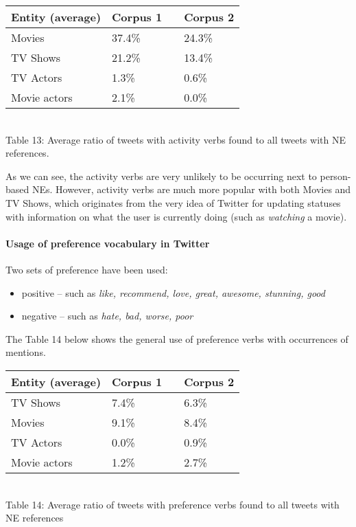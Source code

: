 \begin{center}
  \begin{tabular}{ | p{4cm} | p{2cm} | p{1cm}| p{2cm} | } \hline
    Entity (average) & Corpus 1 & & Corpus 2 \\ \hline
    Movies & 37.4\% & & 24.3\% \\ \hline
    TV Shows & 21.2\% & & 13.4\% \\ \hline
    TV Actors & 1.3\% & & 0.6\% \\ \hline
    Movie actors & 2.1\% & & 0.0\% \\ \hline
  \end{tabular} \\
  Table 13: Average ratio of tweets with activity verbs found to all tweets with NE references. \\
\end{center}

As we can see, the activity verbs are very unlikely to be occurring next to
person-based NEs. However, activity verbs are much more popular with both
Movies and TV Shows, which originates from the very idea of Twitter for
updating statuses with information on what the user is currently doing (such as \textit{watching}
a movie).

\paragraph{Usage of preference vocabulary in Twitter}
Two sets of preference have been used:
\begin{itemize}
  \item positive -- such as \textit{like, recommend, love, great, awesome, stunning, good}
  \item negative -- such as \textit{hate, bad, worse, poor}
\end{itemize}

The Table 14 below shows the general use of preference verbs with occurrences of
mentions.

\begin{center}
  \begin{tabular}{ | p{4cm} | p{2cm} | p{1cm}| p{2cm} | } \hline
    Entity (average) & Corpus 1 & & Corpus 2 \\ \hline
    TV Shows & 7.4\% & & 6.3\% \\ \hline
    Movies & 9.1\% & & 8.4\% \\ \hline
    TV Actors & 0.0\% & & 0.9\% \\ \hline
    Movie actors & 1.2\% & & 2.7\% \\ \hline
  \end{tabular} \\
  Table 14: Average ratio of tweets with preference verbs found to all tweets with NE references \\
\end{center}

